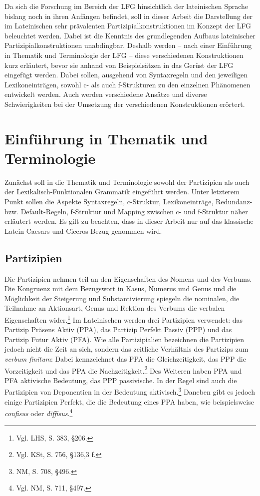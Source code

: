 \documentclass[12pt,a4paper]{article}
\begin{document}
Da sich die Forschung im Bereich der LFG hinsichtlich der lateinischen Sprache bislang noch in ihren Anfängen befindet, soll in dieser Arbeit die Darstellung der im Lateinischen sehr prävalenten Partizipialkonstruktionen im Konzept der LFG beleuchtet werden. Dabei ist die Kenntnis des grundlegenden Aufbaus lateinischer Partizipialkonstruktionen unabdingbar. Deshalb werden -- nach einer Einführung in Thematik und Terminologie der LFG -- diese verschiedenen Konstruktionen kurz erläutert, bevor sie anhand von Beispielsätzen in das Gerüst der LFG eingefügt werden. Dabei sollen, ausgehend von Syntaxregeln und den jeweiligen Lexikoneinträgen, sowohl c- als auch f-Strukturen zu den einzelnen Phänomenen entwickelt werden. Auch werden verschiedene Ansätze und diverse Schwierigkeiten bei der Umsetzung der verschiedenen Konstruktionen erörtert.

\section{Einführung in Thematik und Terminologie}
Zunächst soll in die Thematik und Terminologie sowohl der Partizipien als auch der Lexikalisch-Funktionalen Grammatik eingeführt werden. Unter letzterem Punkt sollen die Aspekte Syntaxregeln, c-Struktur, Lexikoneinträge, Redundanz- bzw. Default-Regeln, f-Struktur und Mapping zwischen c- und f-Struktur näher erläutert werden. Es gilt zu beachten, dass in dieser Arbeit nur auf das klassische Latein Caesars und Ciceros Bezug genommen wird. 

\subsection{Partizipien}
Die Partizipien nehmen teil an den Eigenschaften des Nomens und des Verbums. Die Kongruenz mit dem Bezugswort in Kasus, Numerus und Genus und die Möglichkeit der Steigerung und Substantivierung spiegeln die nominalen, die Teilnahme an Aktionsart, Genus und Rektion des Verbums die verbalen Eigenschaften wider.\footnote{Vgl. LHS, S. 383, §206.}
Im Lateinischen werden drei Partizipien verwendet: das Partizip Präsens Aktiv (PPA), das Partizip Perfekt Passiv (PPP) und das Partizip Futur Aktiv (PFA).
Wie alle Partizipialien bezeichnen die Partizipien jedoch nicht die Zeit an sich, sondern das zeitliche Verhältnis des Partizips zum \textit{verbum finitum}: Dabei kennzeichnet das PPA die Gleichzeitigkeit, das PPP die Vorzeitigkeit und das PPA die Nachzeitigkeit.\footnote{Vgl. KSt, S. 756, §136,3 f.}
Des Weiteren haben PPA und PFA aktivische Bedeutung, das PPP passivische. In der Regel sind auch die Partizipien von Deponentien in der Bedeutung aktivisch.\footnote{NM, S. 708, §496.} Daneben gibt es jedoch einige Partizipien Perfekt, die die Bedeutung eines PPA haben, wie beispielsweise \textit{confisus} oder \textit{diffisus}.\footnote{Vgl. NM, S. 711, §497.}
\end{document}
